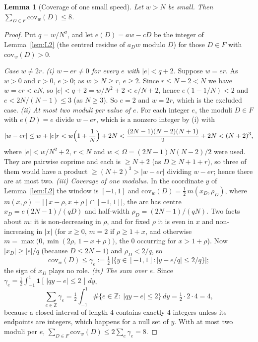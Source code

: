 \documentclass[11pt]{article}
\newtheorem{lemma}[theorem]{Lemma}
\theoremstyle{definition}
\theoremstyle{remark}
\newcommand{\ZZ}{\mathbb{Z}}
\begin{document}
\begin{lemma}[Coverage of one small speed]\label{lem:L3}
Let $w>N$ be small. Then $\sum_{D\in F}\mathrm{cov}_w(D)\le8$.
\end{lemma}
\begin{proof}
Put $q=w/N^2$, and let $e(D)=aw-cD$ be the integer of Lemma~\ref{lem:L2} (the centred residue of $a_Dw$ modulo $D$) for those $D\in F$ with $\mathrm{cov}_w(D)>0$.

\emph{Case $w\ne2r$.} \emph{(i) $w-er\ne0$ for every $e$ with $|e|<q+2$.} Suppose $w=er$. As $w>0$ and $r>0$, $e>0$; as $w>N\ge r$, $e\ge2$. Since $r\le N-2<N$ we have $w=er<eN$, so $|e|<q+2=w/N^2+2<e/N+2$, hence $e(1-1/N)<2$ and $e<2N/(N-1)\le3$ (as $N\ge3$). So $e=2$ and $w=2r$, which is the excluded case. \emph{(ii) At most two moduli per value of $e$.} For each integer $e$, the moduli $D\in F$ with $e(D)=e$ divide $w-er$, which is a nonzero integer by (i) with
\[
|w-er|\le w+|e|r<w\Bigl(1+\frac1N\Bigr)+2N<\frac{(2N-1)(N-2)(N+1)}2+2N<(N+2)^3,
\]
where $|e|<w/N^2+2$, $r<N$ and $w<\Omega=(2N-1)N(N-2)/2$ were used. They are pairwise coprime and each is $\ge N+2$ (as $D\ge N+1+r$), so three of them would have a product $\ge(N+2)^3>|w-er|$ dividing $w-er$; hence there are at most two. \emph{(iii) Coverage of one modulus.} In the coordinate $y$ of Lemma~\ref{lem:L2} the window is $[-1,1]$ and $\mathrm{cov}_w(D)=\frac12\,m(x_D,\rho_D)$, where $m(x,\rho)=|[x-\rho,x+\rho]\cap[-1,1]|$, the arc has centre $x_D=e(2N-1)/(qD)$ and half-width $\rho_D=(2N-1)/(qN)$. Two facts about $m$: it is non-decreasing in $\rho$, and for fixed $\rho$ it is even in $x$ and non-increasing in $|x|$ (for $x\ge0$, $m=2$ if $\rho\ge1+x$, and otherwise $m=\max\bigl(0,\min(2\rho,\,1-x+\rho)\bigr)$, the $0$ occurring for $x>1+\rho$). Now $|x_D|\ge|e|/q$ (because $D\le2N-1$) and $\rho_D<2/q$, so
\[
\mathrm{cov}_w(D)\le\gamma_e:=\tfrac12\,\bigl|\{y\in[-1,1]:|y-e/q|\le2/q\}\bigr|;
\]
the sign of $x_D$ plays no role. \emph{(iv) The sum over $e$.} Since $\gamma_e=\frac12\int_{-1}^{1}\mathbf 1[\,|qy-e|\le2\,]\,dy$,
\[
\sum_{e\in\ZZ}\gamma_e=\tfrac12\int_{-1}^{1}\#\{e\in\ZZ:\ |qy-e|\le2\}\,dy=\tfrac12\cdot2\cdot4=4,
\]
because a closed interval of length $4$ contains exactly $4$ integers unless its endpoints are integers, which happens for a null set of $y$. With at most two moduli per $e$, $\sum_{D\in F}\mathrm{cov}_w(D)\le2\sum_e\gamma_e=8$.


\end{proof}
\end{document}
